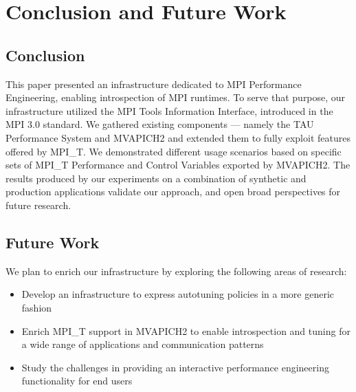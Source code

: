 \chapter{Conclusion and Future Work}
\section{Conclusion}
This paper presented an infrastructure dedicated to MPI Performance Engineering, enabling introspection of MPI runtimes.
To serve that purpose, our infrastructure utilized the MPI Tools Information Interface, introduced in the MPI 3.0 standard.
We gathered existing components --- namely the TAU Performance System and MVAPICH2 and extended them to fully exploit features offered by MPI\_T.
We demonstrated different usage scenarios based on specific sets of MPI\_T Performance and Control Variables exported by MVAPICH2.
The results produced by our experiments on a combination of synthetic and production applications validate our approach, and open broad perspectives for future research.
\section{Future Work}
We plan to enrich our infrastructure by exploring the following areas of research:
\begin{itemize}
	\item Develop an infrastructure to express autotuning policies in a more generic fashion
        \item Enrich MPI\_T support in MVAPICH2 to enable introspection and tuning for a wide range of applications and communication patterns
	\item Study the challenges in providing an interactive performance engineering functionality for end users
\end{itemize}

